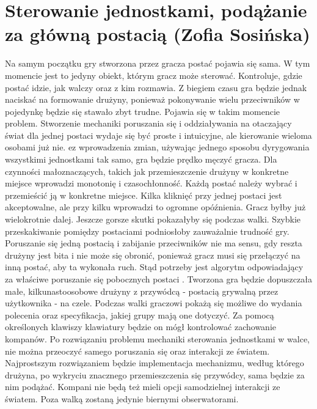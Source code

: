 \section{Sterowanie jednostkami, podążanie za główną postacią (Zofia Sosińska)}\label{chap:sjpzgp}

    Na samym początku gry stworzona przez gracza postać pojawia się sama. W tym momencie jest to jedyny obiekt, którym gracz może sterować. Kontroluje, gdzie postać idzie, jak walczy oraz z kim rozmawia. Z biegiem czasu gra będzie jednak naciskać na formowanie drużyny, ponieważ pokonywanie wielu przeciwników w pojedynkę będzie się stawało zbyt trudne. Pojawia się w takim momencie problem. Stworzenie mechaniki poruszania się i oddziaływania na otaczający świat dla jednej postaci wydaje się być proste i intuicyjne, ale kierowanie wieloma osobami już nie. 
    ez wprowadzenia zmian, używając jednego sposobu dyrygowania wszystkimi jednostkami tak samo, gra będzie prędko męczyć gracza. Dla czynności małoznaczących, takich jak przemieszczenie drużyny w konkretne miejsce wprowadzi monotonię i czasochłonność. Każdą postać należy wybrać i przemieścić ją w konkretne miejsce. Kilka kliknięć przy jednej postaci jest akceptowalne, ale przy kilku wprowadzi to ogromne opóźnienia. Gracz byłby już wielokrotnie dalej. Jeszcze gorsze skutki pokazałyby się podczas walki. Szybkie przeskakiwanie pomiędzy postaciami podniosłoby zauważalnie trudność gry. Poruszanie się jedną postacią i zabijanie przeciwników nie ma sensu, gdy reszta drużyny jest bita i nie może się obronić, ponieważ gracz musi się przełączyć na inną postać, aby ta wykonała ruch. Stąd potrzeby jest algorytm odpowiadający za właściwe poruszanie się pobocznych postaci .
    Tworzona gra będzie dopuszczała małe, kilkunastoosobowe drużyny z przywódcą - postacią grywalną przez użytkownika - na czele. Podczas walki graczowi pokażą się możliwe do wydania polecenia oraz specyfikacja, jakiej grupy mają one dotyczyć. Za pomocą określonych klawiszy klawiatury będzie on mógł kontrolować zachowanie kompanów.
    Po rozwiązaniu problemu mechaniki sterowania jednostkami w walce, nie można przeoczyć samego poruszania się oraz interakcji ze światem. Najprostszym rozwiązaniem będzie implementacja mechanizmu, według którego drużyna, po wykryciu znacznego przemieszczenia się przywódcy, sama będzie za nim podążać. Kompani nie będą też mieli opcji samodzielnej interakcji ze światem. Poza walką zostaną jedynie biernymi obserwatorami.

